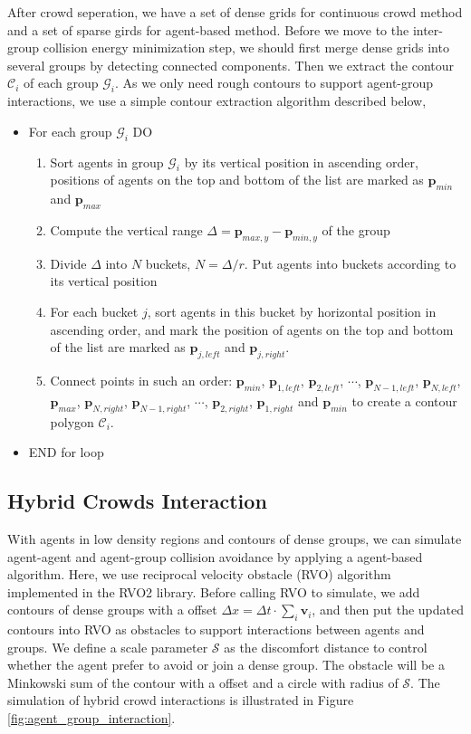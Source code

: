 \documentclass{egpubl}
\begin{document}
After crowd seperation, we have a set of dense grids for continuous crowd method and a set of sparse girds for agent-based method. Before we move to the inter-group collision energy minimization step, we should first merge dense grids into several groups by detecting connected components. Then we extract the contour $\mathcal{C}_i$ of each group $\mathcal{G}_i$. As we only need rough contours to support agent-group interactions, we use a simple contour extraction algorithm described below,
\begin{itemize}
\item For each group $\mathcal{G}_i$ DO
\begin{enumerate}
\item Sort agents in group $\mathcal{G}_i$ by its vertical position in ascending order, positions of agents on the top and bottom of the list are marked as $\textbf{p}_{min}$ and $\textbf{p}_{max}$
\item Compute the vertical range $\Delta = \textbf{p}_{max, y} - \textbf{p}_{min, y}$ of the group
\item Divide $\Delta$ into $N$ buckets, $N = {\Delta}/{r}$. Put agents into buckets according to its vertical position
\item For each bucket $j$, sort agents in this bucket by horizontal position in ascending order, and mark the position of agents on the top and bottom of the list are marked as $\textbf{p}_{j, left}$ and $\textbf{p}_{j, right}$.
\item Connect points in such an order: $\textbf{p}_{min}$, $\textbf{p}_{1, left}$, $\textbf{p}_{2, left}$, $\cdots$, $\textbf{p}_{N-1, left}$, $\textbf{p}_{N, left}$, $\textbf{p}_{max}$, $\textbf{p}_{N, right}$, $\textbf{p}_{N-1, right}$, $\cdots$, $\textbf{p}_{2, right}$, $\textbf{p}_{1, right}$ and $\textbf{p}_{min}$ to create a contour polygon $\mathcal{C}_i$.
\end{enumerate}
\item END for loop
\end{itemize}

\subsection{Hybrid Crowds Interaction}
\label{section:4.3}

With agents in low density regions and contours of dense groups, we can simulate agent-agent and agent-group collision avoidance by applying a agent-based algorithm. Here, we use reciprocal velocity obstacle (RVO) algorithm \cite{VDBerg:2008} implemented in the RVO2 library. Before calling RVO to simulate, we add contours of dense groups with a offset $\Delta x = \Delta t \cdot \sum_{i}{\textbf{v}_i}$, and then put the updated contours into RVO as obstacles to support interactions between agents and groups. We define a scale parameter $\mathcal{S}$ as the discomfort distance to control whether the agent prefer to avoid or join a dense group. The obstacle will be a Minkowski sum of the contour with a offset and a circle with radius of $\mathcal{S}$. The simulation of hybrid crowd interactions is illustrated in Figure \ref{fig:agent_group_interaction}.
\end{document}
